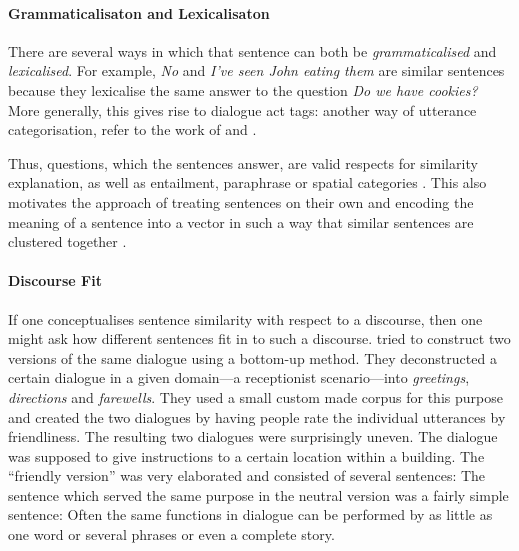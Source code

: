 \documentclass[11pt]{article}
\begin{document}
\paragraph{Grammaticalisaton and Lexicalisaton}

There are several ways in which that sentence can both be \emph{grammaticalised} and \emph{lexicalised}. For example, \textit{No} and \textit{I've seen John eating them} are similar sentences because they lexicalise the same answer to the question \textit{Do we have cookies?} More generally, this gives rise to dialogue act tags: another way of utterance categorisation, refer to the work of  and .

Thus, questions, which the sentences answer, are valid respects for similarity explanation, as well as entailment, paraphrase \cite{White:2015:WSE:2838931.2838932} or spatial categories \cite{ritter-EtAl:2015:*SEM2015}. This also motivates the approach of treating sentences on their own and encoding the meaning of a sentence into a vector in such a way that similar sentences are clustered together \cite{DBLP:journals/corr/abs-1003-4394,baroni2014frege,Socher:2012:SCT:2390948.2391084,wieting2015paraphrase,DBLP:journals/corr/HillCK16}.

\paragraph{Discourse Fit}

If one conceptualises sentence similarity with respect to a discourse, then one might ask how different sentences fit in to such a discourse.  tried to construct two versions of the same dialogue using a bottom-up method. They deconstructed a certain dialogue in a given domain---a receptionist scenario---into \textit{greetings}, \textit{directions} and \textit{farewells}. They used a small custom made corpus for this purpose and created the two dialogues by having people rate the individual utterances by friendliness. The resulting two dialogues were surprisingly uneven. The dialogue was supposed to give instructions to a certain location within a building. The ``friendly version'' was very elaborated and consisted of several sentences:
The sentence which served the same purpose in the neutral version was a fairly simple sentence:
Often the same functions in dialogue can be performed by as little as one word or several phrases or even a complete story. 
\end{document}

